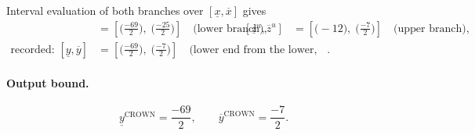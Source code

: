 \documentclass[11pt]{article}
\begin{document}
Interval evaluation of both branches over $[\underline{x}, \overline{x}]$ gives
\begin{align*}
[\underline{z}^{\ell}, \overline{z}^{\ell}] &= [\bigl(\frac{-69}{2}\bigr),\; \bigl(\frac{-25}{2}\bigr)] \quad\text{(lower branch)}, & [\underline{z}^{u}, \overline{z}^{u}] &= [\bigl(-12\bigr),\; \bigl(\frac{-7}{2}\bigr)] \quad\text{(upper branch)}, \\
\text{recorded: } [\underline{y}, \overline{y}] &= [\bigl(\frac{-69}{2}\bigr),\; \bigl(\frac{-7}{2}\bigr)] \quad\text{(lower end from the lower, upper end from the upper branch)}.
\end{align*}
\paragraph{Output bound.}
\begin{equation*}
\underline{y}^{\text{CROWN}} = \frac{-69}{2}, \qquad \overline{y}^{\text{CROWN}} = \frac{-7}{2}.
\end{equation*}
\end{document}

